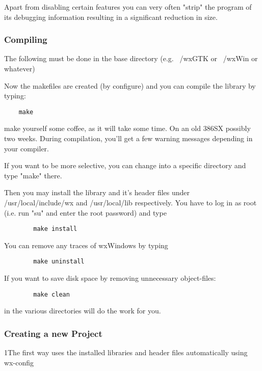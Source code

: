 Apart from disabling certain features you can very often "strip"
the program of its debugging information resulting in a significant
reduction in size.

\subsubsection{Compiling}

The following must be done in the base directory (e.g. ~/wxGTK
or ~/wxWin or whatever)

Now the makefiles are created (by configure) and you can compile 
the library by typing:

\begin{verbatim}
	make
\end{verbatim}

make yourself some coffee, as it will take some time. On an old
386SX possibly two weeks. During compilation, you'll get a few 
warning messages depending in your compiler.

If you want to be more selective, you can change into a specific
directory and type "make" there.

Then you may install the library and it's header files under
/usr/local/include/wx and /usr/local/lib respectively. You
have to log in as root (i.e. run "su" and enter the root
password) and type

\begin{verbatim}
        make install	
\end{verbatim}

You can remove any traces of wxWindows by typing

\begin{verbatim}
        make uninstall
\end{verbatim}
	
If you want to save disk space by removing unnecessary
object-files:

\begin{verbatim}
	    make clean
\end{verbatim}

in the various directories will do the work for you.

\subsubsection{Creating a new Project}

1\ket The first way uses the installed libraries and header files
automatically using wx-config

